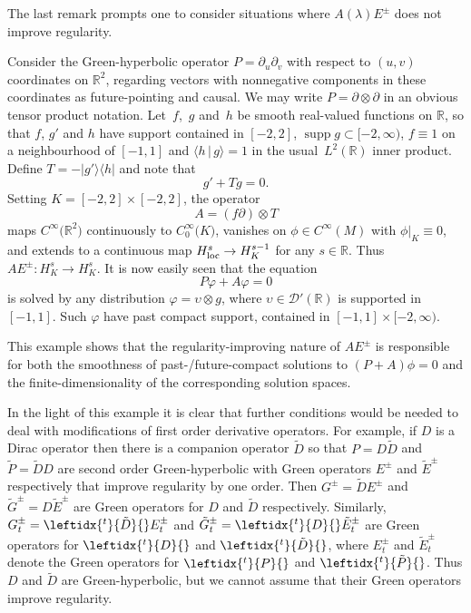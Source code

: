 \documentclass[pdftex]{sigma}
\numberwithin{equation}{section}
\newcommand{\RR}{{\mathbb R}}
\newcommand{\CoinX}[1]{C_0^\infty\big({#1}\big)}
\newcommand{\DD}{{\mathscr D}}
\DeclareMathOperator{\supp}{supp}
\newcommand{\ip}[2]{{\big\langle #1 \, \big|\, #2\big\rangle}}
\newcommand{\ket}[1]{{\vert #1\rangle}}
\newcommand{\bra}[1]{{\langle #1 \vert}}
\newcommand{\loc}{{\rm loc}}
\newcommand{\adj}[1]{\leftidx{^{t}}{#1}{}}
\begin{document}
 The last remark prompts one to consider situations where $A(\lambda)E^\pm$ does not improve regularity.
 \begin{Example}\label{ex:nihilo}
 	Consider the Green-hyperbolic operator $P=\partial_u\partial_v$ with respect to $(u,v)$ coordinates on $\RR^2$, regarding vectors with nonnegative components in these coordinates as future-pointing and causal. We may write $P=\partial\otimes\partial$ in an obvious tensor product notation. Let~$f$,~$g$ and~$h$ be smooth real-valued functions on $\RR$, so that $f$, $g'$ and $h$ have support contained in $[-2,2]$, $\supp g\subset [-2,\infty)$, $f\equiv 1$ on a neighbourhood of $[-1,1]$ and $\ip{h}{g}=1$ in the usual~$L^2(\RR)$ inner product.
 	Define $T=-\ket{g'}\bra{h}$ and note that
 	\begin{equation*}
 		g' + T g = 0.
 	\end{equation*}
 	Setting $K=[-2,2]\times[-2,2]$, the operator
 	\begin{equation*}
 		A = (f\partial)\otimes T
 	\end{equation*}
 	maps $C^\infty\big(\RR^2\big)$ continuously to $\CoinX{K}$, vanishes on
 	$\phi\in C^\infty(M)$ with $\phi|_K\equiv 0$, and extends to a continuous map $H^s_\loc\to H^{s-1}_K$ for any $s\in\RR$. Thus $AE^\pm\colon H^s_K\to H^s_K$. It is now easily seen that the equation
 	\begin{equation*}
 		P\varphi + A \varphi = 0
 	\end{equation*}
 	is solved by any distribution $\varphi=\upsilon\otimes g$, where $\upsilon\in\DD'(\RR)$ is supported in $[-1,1]$. Such $\varphi$ have past compact support, contained in $[-1,1]\times [-2,\infty)$.
 	
 	This example shows that the regularity-improving nature of $AE^\pm$ is
 	responsible for both the smoothness of past-/future-compact solutions to $(P+A)\phi=0$ and the finite-dimensionality of the corresponding solution spaces.
 \end{Example}

 In the light of this example it is clear that further conditions would be needed to deal with modifications of first order derivative operators. For example, if $D$ is a Dirac operator then
 there is a companion operator $\tilde{D}$ so that $P = D\tilde{D}$
 and $\tilde{P}=\tilde{D}D$ are second order Green-hyperbolic with Green operators $E^\pm$ and $\tilde{E}^\pm$ respectively that improve regularity by one order. Then $G^\pm = \tilde{D}E^\pm$ and $\tilde{G}^\pm = D\tilde{E}^\pm$ are Green operators for $D$ and $\tilde{D}$ respectively. Similarly,
 $G_t^\pm = \adj{\tilde{D}}E_t^\pm$ and $\tilde{G}_t^\pm = \adj{D}\tilde{E}_t^\pm$ are Green operators for $\adj{D}$ and $\adj{\tilde{D}}$, where $E_t^\pm$ and $\tilde{E}_t^\pm$ denote the Green operators for $\adj{P}$ and $\adj{\tilde{P}}$. Thus $D$ and $\tilde{D}$ are Green-hyperbolic, but we cannot assume
 that their Green operators improve regularity.
\end{document}
